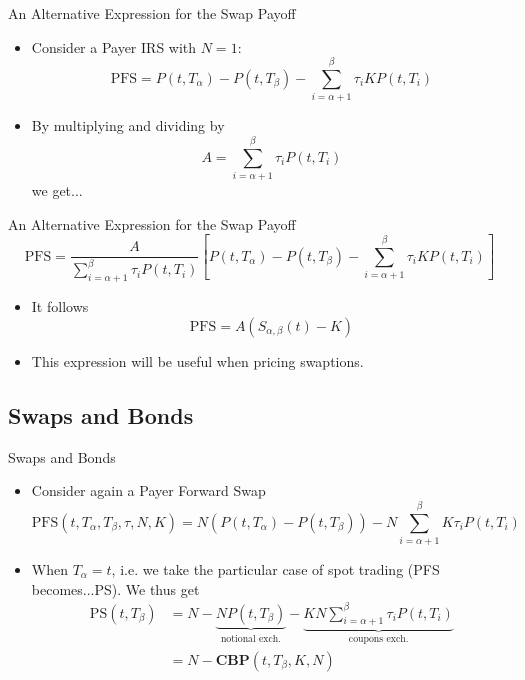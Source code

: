 \documentclass{beamer}
\begin{document}
\begin{frame}{An Alternative Expression for the Swap Payoff}
	\begin{itemize}
		\item Consider a Payer IRS with $N=1$:
		\begin{equation*}
			\text{PFS} = P(t,T_\alpha)-P(t,T_\beta)-\sum_{i=\alpha+1}^{\beta}\tau_iKP(t,T_i)
		\end{equation*}
		\item By multiplying and dividing by
		\begin{equation}
			A = \sum_{i=\alpha+1}^{\beta}\tau_iP(t, T_i)
		\end{equation}
		we get...
	\end{itemize}
\end{frame}

\begin{frame}{An Alternative Expression for the Swap Payoff}
	\begin{equation*}
		\text{PFS}=\frac{A}{\sum_{i=\alpha+1}^{\beta}\tau_iP(t, T_i)}\left[P(t,T_\alpha)-P(t,T_\beta)-\sum_{i=\alpha+1}^{\beta}\tau_iKP(t,T_i)\right]
	\end{equation*}
	\begin{itemize}
		\item It follows
		\begin{equation}
			\text{PFS}=A (S_{\alpha,\beta}(t)-K)
		\end{equation}
		\item This expression will be useful when pricing swaptions.
	\end{itemize}
\end{frame}

\subsection{Swaps and Bonds}
\begin{frame}{Swaps and Bonds}
	\begin{itemize}
		\item Consider again a Payer Forward Swap
		\begin{equation*}
			\text{PFS}(t,T_\alpha,T_\beta,\tau,N,K)=N(P(t,T_\alpha)-P(t,T_\beta))-N\sum_{i=\alpha+1}^{\beta} K\tau_iP(t,T_i)
		\end{equation*}
		\item When $T_\alpha = t$, i.e. we take the particular case of spot trading (PFS becomes...PS). We thus get
		\begin{equation*}
			\begin{aligned}
				\text{PS}(t,T_\beta) &=N-\underbrace{NP(t,T_\beta)}_{\text{notional exch.}}-\underbrace{KN\sum_{i=\alpha+1}^{\beta} \tau_iP(t,T_i)}_{\text{coupons exch.}} \\
				&=N-\textbf{CBP}(t,T_\beta,K,N)
			\end{aligned}
		\end{equation*}
	\end{itemize}
\end{frame}
\end{document}
